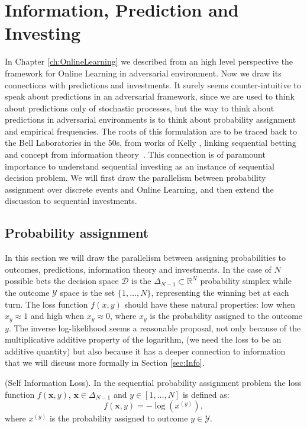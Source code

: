 \chapter{Information, Prediction and Investing}\label{ch:OPO}

In Chapter \ref{ch:OnlineLearning} we described from an high level perspective the framework for Online Learning in adversarial environment. Now we draw its connections with predictions and investments. It surely seems counter-intuitive to speak about predictions in an adversarial framework, since we are used to think about predictions only of stochastic processes, but the way to think about predictions in adversarial environments is to think about probability assignment and empirical frequencies. The roots of this formulation are to be traced back to the Bell Laboratories in the 50s, from works of Kelly \cite{kelly1956new}, linking sequential betting and concept from information theory~\cite{cover2012elements}. This connection is of paramount importance to understand sequential investing as an instance of sequential decision problem.
We will first draw the parallelism between probability assignment over discrete events and Online Learning, and then extend the discussion to sequential investments.

\section{Probability assignment}
In this section we will draw the parallelism between assigning probabilities to outcomes, predictions, information theory and investments.  
In the case of $N$ possible bets the decision space $\mathcal D$ is the $\Delta_{N-1}\subset \mathbb R^{N}$ probability simplex while the outcome $\mathcal Y$ space is the set $\{1,\ldots,N\}$, representing the winning bet at each turn. The loss function $f(x,y)$ should have these natural properties: low when $x_y\approx1$ and high when $x_y\approx0$, where $x_y$ is the probability assigned to the outcome $y$. The inverse log-likelihood seems a reasonable proposal, not only because of the multiplicative additive property of the logarithm, (we need the loss to be an additive quantity) but also because it has a deeper connection to information that we will discuss more formally in Section \ref{sec:Info}.

\begin{definition}(Self Information Loss).\label{def:log_loss}
    In the sequential probability assignment problem the loss function $f(\mathbf x,y)$, $\mathbf x\in \Delta_{N-1}$ and $y\in[1,\ldots,N]$ is defined as:
    $$f(\mathbf x,y)=-\log\left(x^{(y)}\right),$$
where $x^{(y)}$ is the probability assigned to outcome $y\in\mathcal Y$.
\end{definition}

